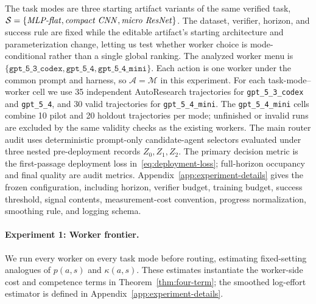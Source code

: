 \documentclass{article}
\newcommand{\cA}{\mathcal{A}}
\newcommand{\cM}{\mathcal{M}}
\newcommand{\cS}{\mathcal{S}}
\begin{document}
The task modes are three starting artifact variants of the same verified task, \(\cS=\{\text{\textit{MLP-flat}},\text{\textit{compact CNN}},\text{\textit{micro ResNet}}\}\).
The dataset, verifier, horizon, and success rule are fixed while the editable artifact's starting architecture and parameterization change, letting us test whether worker choice is mode-conditional rather than a single global ranking.
The analyzed worker menu is \(\{\texttt{gpt\_5\_3\_codex},\texttt{gpt\_5\_4},\texttt{gpt\_5\_4\_mini}\}\).
Each action is one worker under the common prompt and harness, so \(\cA=\cM\) in this experiment.
For each task-mode--worker cell we use 35 independent AutoResearch trajectories for \texttt{gpt\_5\_3\_codex} and \texttt{gpt\_5\_4}, and 30 valid trajectories for \texttt{gpt\_5\_4\_mini}.
The \texttt{gpt\_5\_4\_mini} cells combine 10 pilot and 20 holdout trajectories per mode; unfinished or invalid runs are excluded by the same validity checks as the existing workers.
The main router audit uses deterministic prompt-only candidate-agent selectors evaluated under three nested pre-deployment records \(Z_0,Z_1,Z_2\).
The primary decision metric is the first-passage deployment loss in~\eqref{eq:deployment-loss}; full-horizon occupancy and final quality are audit metrics.
Appendix~\ref{app:experiment-details} gives the frozen configuration, including horizon, verifier budget, training budget, success threshold, signal contents, measurement-cost convention, progress normalization, smoothing rule, and logging schema.

\paragraph{Experiment 1: Worker frontier.}

We run every worker on every task mode before routing, estimating fixed-setting analogues of \(p(a,s)\) and \(\kappa(a,s)\).
These estimates instantiate the worker-side cost and competence terms in Theorem~\ref{thm:four-term}; the smoothed log-effort estimator is defined in Appendix~\ref{app:experiment-details}.
\end{document}
